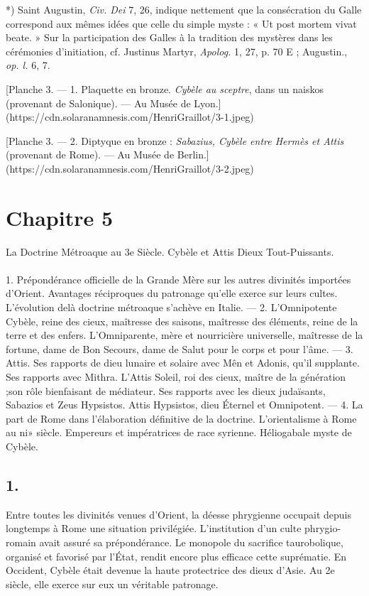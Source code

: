 \documentclass[a4paper, 11pt, oneside, polutonikogreek, french]{article}
\begin{document}
*) Saint Augustin, \emph{Civ. Dei} 7, 26, indique nettement que la consécration du Galle correspond aux mêmes idées que celle du simple myste : « Ut post mortem vivat beate. » Sur la participation des Galles à la tradition des mystères dans les cérémonies d'initiation, cf. Justinus Martyr, \emph{Apolog.} 1, 27, p. 70 E ; Augustin., \emph{op. l.} 6, 7.

[Planche 3. --- 1. Plaquette en bronze. \emph{Cybèle au sceptre}, dans un naiskos (provenant de Salonique). --- Au Musée de Lyon.](https://cdn.solaranamnesis.com/HenriGraillot/3-1.jpeg)

[Planche 3. --- 2. Diptyque en bronze : \emph{Sabazius, Cybèle entre Hermès et Attis} (provenant de Rome). --- Au Musée de Berlin.](https://cdn.solaranamnesis.com/HenriGraillot/3-2.jpeg)
\clearpage
\section{Chapitre 5}
\begin{center}
La Doctrine Métroaque au 3e Siècle. Cybèle et Attis Dieux Tout-Puissants.
\end{center}
\paragraph{}
1. Prépondérance officielle de la Grande Mère sur les autres divinités importées d'Orient. Avantages réciproques du patronage qu'elle exerce sur leurs cultes. L'évolution delà doctrine métroaque s'achève en Italie. --- 2. L'Omnipotente Cybèle, reine des cieux, maîtresse des saisons, maîtresse des éléments, reine de la terre et des enfers. L'Omniparente, mère et nourricière universelle, maîtresse de la fortune, dame de Bon Secours, dame de Salut pour le corps et pour l'âme. --- 3. Attis. Ses rapports de dieu lunaire et solaire avec Mên et Adonis, qu'il supplante. Ses rapports avec Mithra. L'Attis Soleil, roi des cieux, maître de la génération ;son rôle bienfaisant de médiateur. Ses rapports avec les dieux judaïsants, Sabazios et Zeus Hypsistos. Attis Hypsistos, dieu Éternel et Omnipotent. --- 4. La part de Rome dans l'élaboration définitive de la doctrine. L'orientalisme à Rome au ni» siècle. Empereurs et impératrices de race syrienne. Héliogabale myste de Cybèle.

\subsection{1.}

Entre toutes les divinités venues d'Orient, la déesse phrygienne occupait depuis longtemps à Rome une situation privilégiée. L'institution d'un culte phrygio-romain avait assuré sa prépondérance. Le monopole du sacrifice taurobolique, organisé et favorisé par l'État, rendit encore plus efficace cette suprématie. En Occident, Cybèle était devenue la haute protectrice des dieux d'Asie. Au 2e siècle, elle exerce sur eux un véritable patronage.
\end{document}
